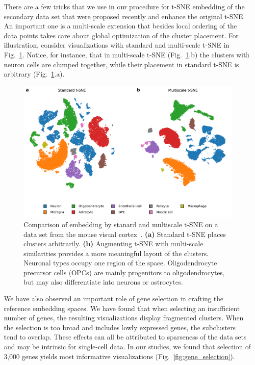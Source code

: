 \documentclass[runningheads]{llncs}
\begin{document}
There are a few tricks that we use in our procedure for t-SNE embedding of the secondary data set that were proposed recently and enhance the original t-SNE. An important one is a multi-scale extension that besides local ordering of the data points takes care about global optimization of the cluster placement. For illustration, consider visualizations with standard and multi-scale t-SNE in Fig.~\ref{fig:multiscale}. Notice, for instance, that in multi-scale t-SNE (Fig.~\ref{fig:multiscale}.b) the clusters with neuron cells are clumped together, while their placement in standard t-SNE is arbitrary (Fig.~\ref{fig:multiscale}.a).


\begin{figure}[htbp]
\includegraphics[width=\textwidth]{figures/hrvatin_multiscale_tsne.pdf}
\caption{Comparison of embedding by stanard and multiscale t-SNE on a data set from the mouse visual cortex~\cite{hrvatin2018}. {\bf (a)} Standard t-SNE places clusters arbitrarily. {\bf (b)} Augmenting t-SNE with multi-scale similarities provides a more meaningful layout of the clusters. Neuronal types occupy one region of the space. Oligodendrocyte precursor cells (OPCs) are mainly progenitors to oligodendrocytes, but may also differentiate into neurons or astrocytes.} \label{fig:multiscale}
\end{figure}

We have also observed an important role of gene selection in crafting the reference embedding spaces. We have found that when selecting an insufficient number of genes, the resulting visualizations display fragmented clusters. When the selection is too broad and includes lowly expressed genes, the subclusters tend to overlap. These effects can all be attributed to sparseness of the data sets and may be intrinsic for single-cell data. In our studies, we found that selection of 3,000 genes yields most informative visualizations (Fig.~\ref{fig:gene_selection}).
\end{document}
